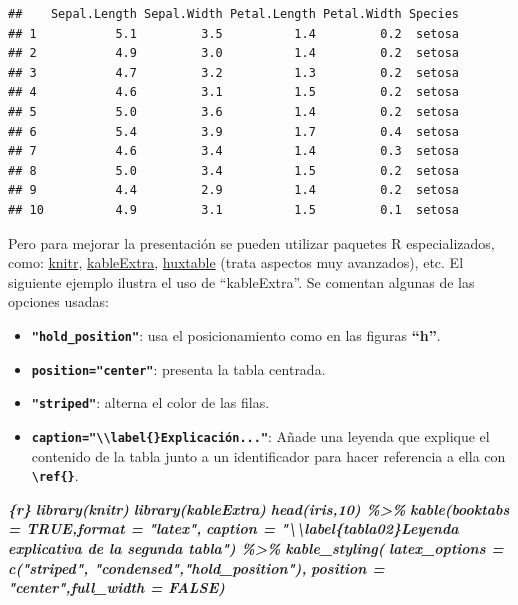 \documentclass[12pt,a4paper,oneside,]{book}
\newenvironment{Shaded}{\begin{snugshade}}{\end{snugshade}}
\newcommand{\InformationTok}[1]{\textcolor[rgb]{0.56,0.35,0.01}{\textbf{\textit{#1}}}}
\providecommand{\tightlist}{%
  \setlength{\itemsep}{0pt}\setlength{\parskip}{0pt}}
\numberwithin{dummy}{section}
\theoremstyle{ocrenumbox}
\theoremstyle{blacknumex}
\theoremstyle{blacknumbox}
\theoremstyle{ocrenum}
\theoremstyle{ocrenum}
\begin{document}
\begin{verbatim}
##    Sepal.Length Sepal.Width Petal.Length Petal.Width Species
## 1           5.1         3.5          1.4         0.2  setosa
## 2           4.9         3.0          1.4         0.2  setosa
## 3           4.7         3.2          1.3         0.2  setosa
## 4           4.6         3.1          1.5         0.2  setosa
## 5           5.0         3.6          1.4         0.2  setosa
## 6           5.4         3.9          1.7         0.4  setosa
## 7           4.6         3.4          1.4         0.3  setosa
## 8           5.0         3.4          1.5         0.2  setosa
## 9           4.4         2.9          1.4         0.2  setosa
## 10          4.9         3.1          1.5         0.1  setosa
\end{verbatim}

Pero para mejorar la presentación se pueden utilizar paquetes R
especializados, como:
\href{https://cran.r-project.org/web/packages/knitr/index.html}{knitr},
\href{https://cran.r-project.org/web/packages/kableExtra/index.html}{kableExtra},
\href{https://cran.r-project.org/web/packages/huxtable/}{huxtable}
(trata aspectos muy avanzados), etc. El siguiente ejemplo ilustra el uso
de ``kableExtra''. Se comentan algunas de las opciones usadas:

\begin{itemize}
\tightlist
\item
  \textbf{\texttt{"hold\_position"}}: usa el posicionamiento como en las
  figuras \textbf{``h''}.
\item
  \textbf{\texttt{position="center"}}: presenta la tabla centrada.
\item
  \textbf{\texttt{"striped"}}: alterna el color de las filas.
\item
  \textbf{\texttt{caption="\textbackslash{}\textbackslash{}label\{\}Explicación..."}}:
  Añade una leyenda que explique el contenido de la tabla junto a un
  identificador para hacer referencia a ella con
  \textbf{\texttt{\textbackslash{}ref\{\}}}.
\end{itemize}

\begin{Shaded}
\begin{Highlighting}[]
\InformationTok{\textasciigrave{}\textasciigrave{}\textasciigrave{}\{r\}}
\InformationTok{library(knitr)}
\InformationTok{library(kableExtra) }
\InformationTok{head(iris,10) \%\textgreater{}\%}
\InformationTok{ kable(booktabs = TRUE,format = "latex",}
\InformationTok{  caption = "\textbackslash{}\textbackslash{}label\{tabla02\}Leyenda explicativa de la segunda tabla") \%\textgreater{}\%}
\InformationTok{ kable\_styling(}
\InformationTok{  latex\_options = c("striped", "condensed","hold\_position"), }
\InformationTok{  position = "center",full\_width = FALSE)}
\InformationTok{\textasciigrave{}\textasciigrave{}\textasciigrave{}}
\end{Highlighting}
\end{Shaded}
\end{document}
